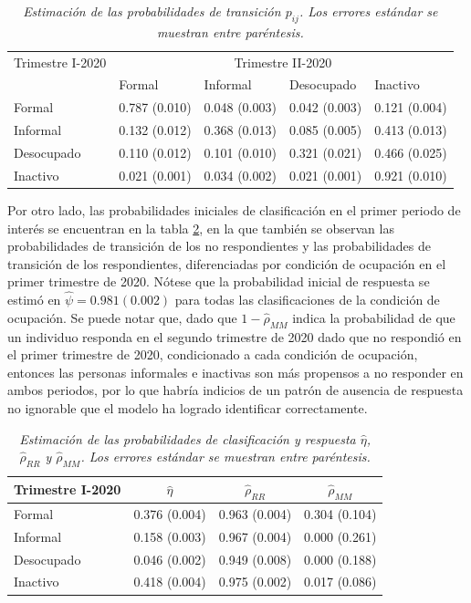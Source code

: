 \documentclass[
  10pt,
  spanish,
]{book}
\begin{document}
\begin{table}[!h]
\centering
\begin{tabular}{lllll}
Trimestre I-2020&\multicolumn{4}{c}{Trimestre II-2020}\\\cline{2-5}
                            & Formal            &Informal       &Desocupado         &Inactivo           \\\hline
Formal              & 0.787 (0.010)     & 0.048 (0.003)     & 0.042 (0.003)     & 0.121 (0.004)         \\
Informal            & 0.132 (0.012)     & 0.368 (0.013)     & 0.085 (0.005)     & 0.413 (0.013)                 \\
Desocupado            & 0.110 (0.012)   & 0.101 (0.010)     & 0.321 (0.021)     & 0.466 (0.025)         \\
Inactivo            & 0.021 (0.001)     & 0.034 (0.002)     & 0.021 (0.001)     & 0.921 (0.010)         \\\hline
\end{tabular}
\caption{\emph{Estimación de las probabilidades de transición $p_{ij}$. Los errores estándar se muestran entre paréntesis.}}
\label{t4}
\end{table}

Por otro lado, las probabilidades iniciales de clasificación en el primer periodo de interés se encuentran en la tabla \ref{t5}, en la que también se observan las probabilidades de transición de los no respondientes y las probabilidades de transición de los respondientes, diferenciadas por condición de ocupación en el primer trimestre de 2020. Nótese que la probabilidad inicial de respuesta se estimó en \(\hat{\psi}=0.981 (0.002)\) para todas las clasificaciones de la condición de ocupación. Se puede notar que, dado que \(1-\hat{\rho}_{MM}\) indica la probabilidad de que un individuo responda en el segundo trimestre de 2020 dado que no respondió en el primer trimestre de 2020, condicionado a cada condición de ocupación, entonces las personas informales e inactivas son más propensos a no responder en ambos periodos, por lo que habría indicios de un patrón de ausencia de respuesta no ignorable que el modelo ha logrado identificar correctamente.

\begin{table}[!h]
\centering
\begin{tabular}{lccc}
\hline 
Trimestre I-2020    & $\hat{\eta}$      & $\hat{\rho}_{RR}$ & $\hat{\rho}_{MM}$ \\ \hline 
Formal                  & 0.376 (0.004) & 0.963 (0.004)     & 0.304 (0.104) \\
Informal              & 0.158 (0.003)   & 0.967 (0.004)     & 0.000 (0.261) \\
Desocupado              & 0.046 (0.002) & 0.949 (0.008)     & 0.000 (0.188) \\
Inactivo          & 0.418 (0.004)   & 0.975 (0.002)     & 0.017 (0.086) \\ \hline
\end{tabular}
\caption{\emph{Estimación de las probabilidades de clasificación y respuesta $\hat{\eta}$, $\hat{\rho}_{RR}$ y $\hat{\rho}_{MM}$. Los errores estándar se muestran entre paréntesis.}}
\label{t5}
\end{table}
\end{document}
